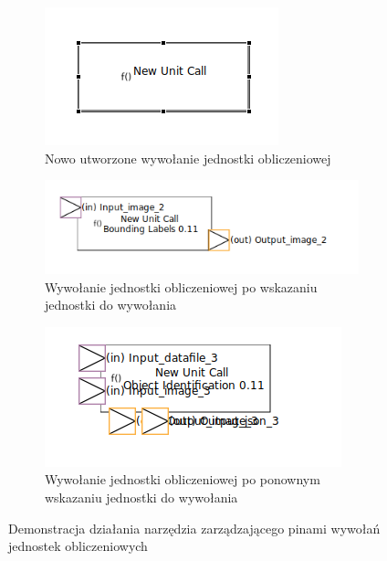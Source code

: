 \begin{figure}[h]
	\centering
	\begin{subfigure}{.3\textwidth}
		\centering
		\includegraphics[width=.99\linewidth]{./images/sirius-desktop-empty-unit-call.png}
		\caption{Nowo utworzone wywołanie jednostki obliczeniowej}\label{rys:sirius-desktop-empty-unit-call}
	\end{subfigure}
	\begin{subfigure}{.3\textwidth}
		\centering
		\includegraphics[width=.99\linewidth]{./images/sirius-desktop-change-unit-to-call-before.png}
		\caption{Wywołanie jednostki obliczeniowej po wskazaniu jednostki do
      wywołania}\label{rys:sirius-desktop-change-unit-to-call-before}
	\end{subfigure}
	\begin{subfigure}{.3\textwidth}
		\centering
		\includegraphics[width=.99\linewidth]{./images/sirius-desktop-change-unit-to-call-after.png}
		\caption{Wywołanie jednostki obliczeniowej po ponownym wskazaniu jednostki do
        wywołania}\label{rys:sirius-desktop-change-unit-to-call-after}
	\end{subfigure}

	\caption{Demonstracja działania narzędzia zarządzającego pinami wywołań
    jednostek obliczeniowych}\label{rys:sirius-desktop-change-unit-to-call}
\end{figure}

